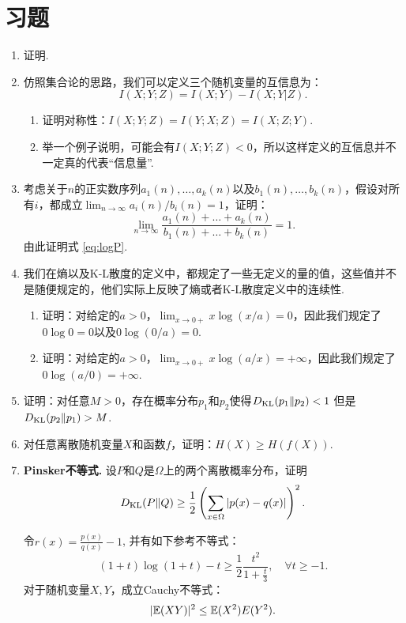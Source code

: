 \section{习题}
\begin{enumerate}[wide, labelindent=0pt]
    \item \label{exercise:conditional-mutual-information} 证明. 
    
    \item \cite{tingAmountInformation1962} 仿照集合论的思路，我们可以定义三个随机变量的互信息为：
    \[I(X;Y;Z)=I(X;Y)-I(X;Y|Z).\]
    \begin{enumerate}
        \item 证明对称性：$I(X;Y;Z)=I(Y;X;Z) = I(X;Z;Y)$.
        \item 举一个例子说明，可能会有$I(X;Y;Z)<0$，所以这样定义的互信息并不一定真的代表“信息量”.
    \end{enumerate}

    \item 考虑关于$n$的正实数序列$a_1(n),\dots,a_k(n)$以及$b_1(n),\dots,b_k(n)$，假设对所有$i$，都成立$\lim_{n\to\infty} a_i(n)/b_i(n)=1$，证明：
    \[\lim_{n\to\infty}\frac{a_1(n)+\dots+a_k(n)}{b_1(n)+\dots+b_k(n)}=1.\]
    由此证明式 \eqref{eq:logP}.

    \item 我们在熵以及K-L散度的定义中，都规定了一些无定义的量的值，这些值并不是随便规定的，他们实际上反映了熵或者K-L散度定义中的连续性.
    \begin{enumerate}
        \item 证明：对给定的$a>0$，$\lim_{x\to 0+}x\log (x/a)=0$，因此我们规定了$0\log 0=0$以及$0\log(0/a)=0$.
        \item 证明：对给定的$a>0$，$\lim_{x\to 0+}x\log (a/x)=+\infty$，因此我们规定了$0\log(a/0)=+\infty$.
    \end{enumerate}
    
    
    \item \label{exercise:kl-divergence-asymmetry} 证明：对任意$M>0$，存在概率分布$p_1$和$p_2$使得$D_{\mathrm{KL}}(p_{1}\Vert p_{2})<1$ 但是 $D_{\mathrm{KL}}(p_{2}\Vert p_{1})>M$.
    
    \item 对任意离散随机变量$X$和函数$f$，证明：$H(X)\geq H(f(X))$.
    
    \item \textbf{Pinsker不等式. }设$P$和$Q$是$\Omega$上的两个离散概率分布，证明
    \[
        D_{\mathrm{KL}}(P\Vert Q) \geq \frac{1}{2} \left(\sum_{x\in \Omega} |p(x) - q(x)|\right)^2.
    \]
    \begin{hint}
        令$r(x) = \frac{p(x)}{q(x)} - 1$, 并有如下参考不等式：
        \[
            (1+t) \log (1+t) - t \geqslant \frac{1}{2} \frac{t^2}{1+\frac{t}{3}}, \quad \forall t \geqslant -1.
        \]
        对于随机变量$X,Y$，成立Cauchy不等式：
        \[
            |\mathbb{E}(XY)|^2 \leq \mathbb{E}(X^2)E(Y^2).
        \]
    \end{hint}


\end{enumerate}
